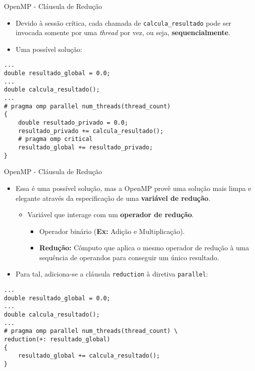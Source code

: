\begin{frame}[fragile]{OpenMP - Cláusula de Redução}
\begin{itemize}
	\item Devido à sessão crítica, cada chamada de \texttt{calcula\_resultado} pode ser invocada somente por uma \textit{thread} por vez, ou seja, \textbf{sequencialmente}.
	\medskip
	\pause
	\item Uma possível solução:
\end{itemize}
\fontsize{8pt}{7.2}\selectfont
\begin{lstlisting}
...
double resultado_global = 0.0;
...
double calcula_resultado();
...
# pragma omp parallel num_threads(thread_count)
{
	double resultado_privado = 0.0;
	resultado_privado += calcula_resultado();
	# pragma omp critical
	resultado_global += resultado_privado;
}
\end{lstlisting}
\fontsize{10pt}{7.2}\selectfont
\end{frame}

\begin{frame}[fragile]{OpenMP - Cláusula de Redução}
\begin{itemize}
	\item Essa é uma possível solução, mas a OpenMP provê uma solução mais limpa e elegante através da especificação de uma \textbf{variável de redução}.
	\smallskip
	\begin{itemize}
		\item Variável que interage com um \textbf{operador de redução}.
		\smallskip
		\begin{itemize}
			\item Operador binário (\textbf{Ex:} Adição e Multiplicação).
			\smallskip
			\item \textbf{Redução:} Cômputo que aplica o mesmo operador de redução à uma sequência de operandos para conseguir um único resultado.
		\end{itemize}
	\end{itemize}
	\medskip
	\pause
	\item Para tal, adiciona-se a cláusula \texttt{reduction} à diretiva \texttt{parallel}:
\end{itemize}
\fontsize{8pt}{7.2}\selectfont
\begin{lstlisting}
...
double resultado_global = 0.0;
...
double calcula_resultado();
...
# pragma omp parallel num_threads(thread_count) \
reduction(+: resultado_global)
{
	resultado_global += calcula_resultado();
}
\end{lstlisting}
\fontsize{10pt}{7.2}\selectfont
\end{frame}

